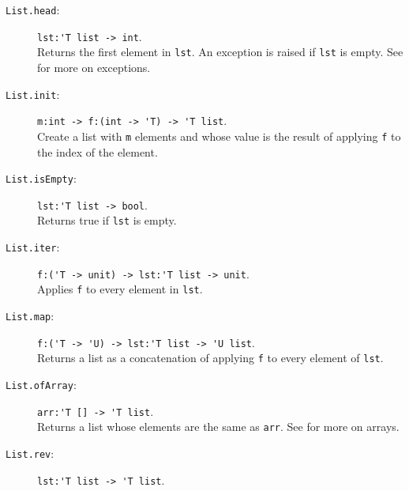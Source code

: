 \documentclass[springer.tex]{subfiles}
\begin{document}
\begin{description}
\item[\texttt{List.head}:] \lstinline{lst:'T list -> int}.~\\
  Returns the first element in \lstinline{lst}. An exception is raised if \lstinline{lst} is empty. See  for more on exceptions.
\item[\texttt{List.init}:] \lstinline{m:int -> f:(int -> 'T) -> 'T list}.~\\
  Create a list with \lstinline{m} elements and whose value is the result of applying \lstinline{f} to the index of the element.
\item[\texttt{List.isEmpty}:]  \lstinline{lst:'T list -> bool}.~\\
  Returns true if \lstinline{lst} is empty.
\item[\texttt{List.iter}:] \lstinline{f:('T -> unit) -> lst:'T list -> unit}.~\\
  Applies \lstinline{f} to every element in \lstinline{lst}.
\item[\texttt{List.map}:] \lstinline{f:('T -> 'U) -> lst:'T list -> 'U list}.~\\
  Returns a list as a concatenation of applying \lstinline{f} to every element of \lstinline{lst}.
\item[\texttt{List.ofArray}:] \lstinline{arr:'T [] -> 'T list}.~\\
  Returns a list whose elements are the same as \lstinline{arr}. See  for more on arrays.
\item[\texttt{List.rev}:] \lstinline{lst:'T list -> 'T list}.~\\

\end{description}
\end{document}
